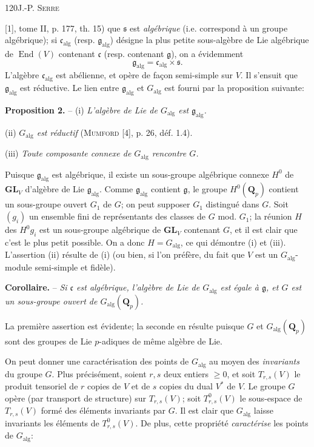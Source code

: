 120\hfill J.-P. \textsc{Serre}

[1], tome II, p. 177, th. 15) que $\mathfrak s$ est \textit{algébrique} (i.e. correspond à un groupe algébrique); si $\mathfrak c_{\mathrm{alg}}$ (resp. $\mathfrak g_{\mathrm{alg}}$) désigne la plus petite sous-algèbre de Lie algébrique de $\operatorname{End}(V)$ contenant $\mathfrak c$ (resp. contenant $\mathfrak g$), on a évidemment
\[
\mathfrak g_{\mathrm{alg}}=\mathfrak c_{\mathrm{alg}}\times\mathfrak s.
\]
L'algèbre $\mathfrak c_{\mathrm{alg}}$ est abélienne, et opère de façon semi-simple sur $V$. Il s'ensuit que $\mathfrak g_{\mathrm{alg}}$ est réductive. Le lien entre $\mathfrak g_{\mathrm{alg}}$ et $G_{\mathrm{alg}}$ est fourni par la proposition suivante:

\textbf{Proposition 2.} -- (i) \textit{L'algèbre de Lie de $G_{\mathrm{alg}}$ est $\mathfrak g_{\mathrm{alg}}$.}

(ii) \textit{$G_{\mathrm{alg}}$ est réductif} (\textsc{Mumford} [4], p. 26, déf. 1.4).

(iii) \textit{Toute composante connexe de $G_{\mathrm{alg}}$ rencontre $G$.}

Puisque $\mathfrak g_{\mathrm{alg}}$ est algébrique, il existe un sous-groupe algébrique connexe $H^0$ de $\mathbf{GL}_V$ d'algèbre de Lie $\mathfrak g_{\mathrm{alg}}$. Comme $\mathfrak g_{\mathrm{alg}}$ contient $\mathfrak g$, le groupe $H^0(\mathbf Q_p)$ contient un sous-groupe ouvert $G_1$ de $G$; on peut supposer $G_1$ distingué dans $G$. Soit $(g_i)$ un ensemble fini de représentants des classes de $G$ mod. $G_1$; la réunion $H$ des $H^0g_i$ est un sous-groupe algébrique de $\mathbf{GL}_V$ contenant $G$, et il est clair que c'est le plus petit possible. On a donc $H=G_{\mathrm{alg}}$, ce qui démontre (i) et (iii). L'assertion (ii) résulte de (i) (ou bien, si l'on préfère, du fait que $V$ est un $G_{\mathrm{alg}}$-module semi-simple et fidèle).

\textbf{Corollaire.} -- \textit{Si $\mathfrak c$ est algébrique, l'algèbre de Lie de $G_{\mathrm{alg}}$ est égale à $\mathfrak g$, et $G$ est un sous-groupe ouvert de $G_{\mathrm{alg}}(\mathbf Q_p)$.}

La première assertion est évidente; la seconde en résulte puisque $G$ et $G_{\mathrm{alg}}(\mathbf Q_p)$ sont des groupes de Lie $p$-adiques de même algèbre de Lie.

On peut donner une caractérisation des points de $G_{\mathrm{alg}}$ au moyen des \textit{invariants} du groupe $G$. Plus précisément, soient $r,s$ deux entiers $\geq0$, et soit $T_{r,s}(V)$ le produit tensoriel de $r$ copies de $V$ et de $s$ copies du dual $V^*$ de $V$. Le groupe $G$ opère (par transport de structure) sur $T_{r,s}(V)$; soit $T^0_{r,s}(V)$ le sous-espace de $T_{r,s}(V)$ formé des éléments invariants par $G$. Il est clair que $G_{\mathrm{alg}}$ laisse invariants les éléments de $T^0_{r,s}(V)$. De plus, cette propriété \textit{caractérise} les points de $G_{\mathrm{alg}}$:

